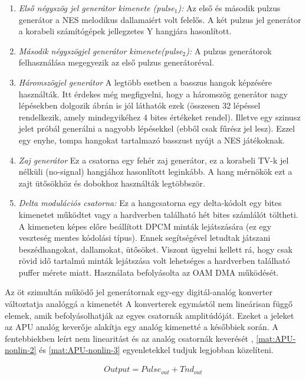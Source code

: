 	\begin{enumerate}
		\item \emph{Első négyszög jel generátor kimenete (pulse$_1$):} Az első és második pulzus generátor a NES melodikus dallamaiért volt felelős. A két pulzus jel generátor a korabeli számítógépek jellegzetes Y hangjára hasonlított. 
		\item \emph{Második négyszögjel generátor kimenete(pulse$_2$):} A pulzus generátorok felhasználása megegyezik az első pulzus generátoréval.
		\item \emph{Háromszögjel generátor} A legtöbb esetben a basszus hangok képzésére használták. Itt érdekes még megfigyelni, hogy a háromszög generátor nagy lépésekben dolgozik  ábrán is jól láthatók ezek (összesen 32 lépéssel rendelkezik, amely mindegyikéhez 4 bites értékeket rendel). Illetve egy szinusz jelet próbál generálni a nagyobb lépésekkel (ebből csak fűrész jel lesz). Ezzel egy enyhe, tompa hangokat tartalmazó basszust nyújt a NES játékoknak. 
		\item\emph{Zaj generátor} Ez a csatorna egy fehér zaj generátor, ez a korabeli TV-k jel nélküli (no-signal) hangjához hasonlított leginkább. A hang mérnökök ezt a zajt ütősökhöz és dobokhoz használták legtöbbször. 
		\item \emph{Delta modulációs csatorna:} Ez a hangcsatorna egy delta-kódolt egy bites kimenetet működtet vagy a hardverben található hét bites számlálót töltheti. A kimeneten képes előre beállított DPCM minták lejátszására (ez egy veszteség mentes kódolási típus). Ennek segítségével letudtak játszani beszédhangokat, dallamokat, ütősöket. Viszont ügyelni kellett rá, hogy csak rövid idő tartalmú minták lejátszása volt lehetséges a hardverben található puffer mérete miatt. Használata befolyásolta az OAM DMA működését.  
	\end{enumerate} 
	
	Az öt szimultán működő jel generátornak egy-egy digitál-analóg konverter változtatja analóggá a kimenetét A konverterek egymástól nem lineárisan függő elemek, amik befolyásolhatják az egyes csatornák amplitúdóját. Ezeket a jeleket az APU analóg keverője alakítja egy analóg kimenetté a későbbiek során. A fentebbiekben leírt nem linearitást és az analóg csatornák keverését , \ref{mat:APU-nonlin-2} és \ref{mat:APU-nonlin-3} egyenletekkel tudjuk legjobban közelíteni.
	
	\begin{align}
		\label{mat:APU-nonlin-1}	
		Output = Pulse_{out} + Tnd_{out}
	\end{align}
	
